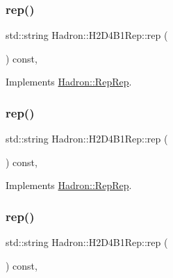 \subsubsection{\texorpdfstring{rep()}{rep()}\hspace{0.1cm}{\footnotesize\ttfamily [2/5]}}
{\footnotesize\ttfamily std\+::string Hadron\+::\+H2\+D4\+B1\+Rep\+::rep (\begin{DoxyParamCaption}{ }\end{DoxyParamCaption}) const\hspace{0.3cm}{\ttfamily [inline]}, {\ttfamily [virtual]}}



Implements \mbox{\hyperlink{structHadron_1_1RepRep_ab3213025f6de249f7095892109575fde}{Hadron\+::\+Rep\+Rep}}.

\mbox{\label{structHadron_1_1H2D4B1Rep_a4f33e88c9985a78b47926b04736e7971}} 
\subsubsection{\texorpdfstring{rep()}{rep()}\hspace{0.1cm}{\footnotesize\ttfamily [3/5]}}
{\footnotesize\ttfamily std\+::string Hadron\+::\+H2\+D4\+B1\+Rep\+::rep (\begin{DoxyParamCaption}{ }\end{DoxyParamCaption}) const\hspace{0.3cm}{\ttfamily [inline]}, {\ttfamily [virtual]}}



Implements \mbox{\hyperlink{structHadron_1_1RepRep_ab3213025f6de249f7095892109575fde}{Hadron\+::\+Rep\+Rep}}.

\mbox{\label{structHadron_1_1H2D4B1Rep_a4f33e88c9985a78b47926b04736e7971}} 
\subsubsection{\texorpdfstring{rep()}{rep()}\hspace{0.1cm}{\footnotesize\ttfamily [4/5]}}
{\footnotesize\ttfamily std\+::string Hadron\+::\+H2\+D4\+B1\+Rep\+::rep (\begin{DoxyParamCaption}{ }\end{DoxyParamCaption}) const\hspace{0.3cm}{\ttfamily [inline]}, {\ttfamily [virtual]}}



